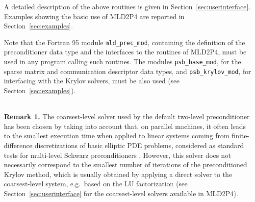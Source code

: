 A detailed description of the above routines is given in Section~\ref{sec:userinterface}.
Examples showing the basic use of MLD2P4 are reported in Section~\ref{sec:examples}.

Note that the Fortran 95 module \verb|mld_prec_mod|, containing the definition of the 
preconditioner data type and the interfaces to the routines of MLD2P4,
must be used in any program calling such routines.
The modules \verb|psb_base_mod|, for the sparse matrix and communication descriptor
data types, and \verb|psb_krylov_mod|, for interfacing with the
Krylov solvers, must be also used (see Section~\ref{sec:examples}).

\ \\
\textbf{Remark 1.} The coarsest-level solver used by the default two-level
preconditioner has been chosen by taking into account that, on parallel
machines, it often leads to the smallest execution time when applied to
linear systems coming from finite-difference discretizations of basic
elliptic PDE problems, considered as standard tests for multi-level Schwarz
preconditioners \cite{aaecc_07,apnum_07}. However, this solver does
not necessarily correspond to the smallest number of iterations of the
preconditioned Krylov method, which is usually obtained by applying
a direct solver to the coarsest-level system, e.g.\ based on the LU
factorization (see Section~\ref{sec:userinterface}
for the coarsest-level solvers available in MLD2P4). 



